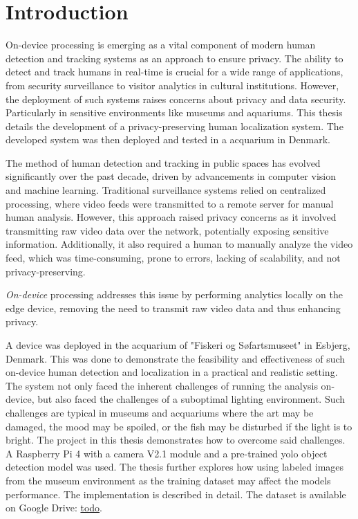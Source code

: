 \section{Introduction}
On-device processing is emerging as a vital component of modern human detection and tracking systems as an approach to ensure privacy. The ability to detect and track humans in real-time is crucial for a wide range of applications, from security surveillance to visitor analytics in cultural institutions. However, the deployment of such systems raises concerns about privacy and data security. Particularly in sensitive environments like museums and aquariums. This thesis details the development of a privacy-preserving human localization system. The developed system was then deployed and tested in a acquarium in Denmark. 

The method of human detection and tracking in public spaces has evolved significantly over the past decade, driven by advancements in computer vision and machine learning. Traditional surveillance systems relied on centralized processing, where video feeds were transmitted to a remote server for manual human analysis. However, this approach raised privacy concerns as it involved transmitting raw video data over the network, potentially exposing sensitive information. Additionally, it also required a human to manually analyze the video feed, which was time-consuming, prone to errors, lacking of scalability, and not privacy-preserving.

\textit{On-device} processing addresses this issue by performing analytics locally on the edge device, removing the need to transmit raw video data and thus enhancing privacy.

A device was deployed in the acquarium of "Fiskeri og Søfartsmuseet" in Esbjerg, Denmark. This was done to demonstrate the feasibility and effectiveness of such on-device human detection and localization in a practical and realistic setting. The system not only faced the inherent challenges of running the analysis on-device, but also faced the challenges of a suboptimal lighting environment. Such challenges are typical in museums and acquariums where the art may be damaged, the mood may be spoiled, or the fish may be disturbed if the light is to bright. The project in this thesis demonstrates how to overcome said challenges. A Raspberry Pi 4 with a camera V2.1 module and a pre-trained yolo object detection model was used. The thesis further explores how using labeled images from the museum environment as the training dataset may affect the models performance. The implementation is described in detail. The dataset is available on Google Drive: \href{todo}{todo}.  


